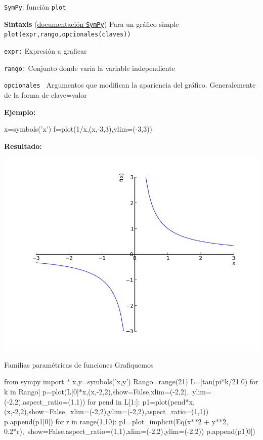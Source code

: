 \documentclass[handout,hyperref={colorlinks=true}]{beamer}
\begin{document}
\begin{frame}[fragile]{\texttt{SymPy}: función \texttt{plot}} 

\textbf{Sintaxis} (\href{http://docs.sympy.org/latest/modules/plotting.html}{documentación \texttt{SymPy}})
Para un gráfico simple
\texttt{plot(expr,rango,opcionales(claves))}

\texttt{expr:} Expresión a graficar 

\texttt{rango:} Conjunto donde varia la variable independiente 

\texttt{opcionales } Argumentos que modifican la apariencia del gráfico. Generalemente de la forma de clave=valor

\textbf{Ejemplo:}

\begin{sageblock}
x=symbols('x')
f=plot(1/x,(x,-3,3),ylim=(-3,3))
\end{sageblock}

\textbf{Resultado:} 

\includegraphics[scale=.15]{imagenes/ejemplo_plot.png}
\end{frame}










\begin{frame}[fragile]{Familias paramétricas de funciones} 
Grafiquemos
\begin{sageblock}
from sympy import *
x,y=symbols('x,y')
Rango=range(21)
L=[tan(pi*k/21.0) for k in Rango] 
p=plot(L[0]*x,(x,-2,2),show=False,xlim=(-2,2),\
ylim=(-2,2),aspect_ratio=(1,1))
for pend in L[1:]:
    p1=plot(pend*x,(x,-2,2),show=False,\
xlim=(-2,2),ylim=(-2,2),aspect_ratio=(1,1))
    p.append(p1[0])
for r in range(1,10):
    p1=plot_implicit(Eq(x**2 + y**2, 0.2*r),\
show=False,aspect_ratio=(1,1),xlim=(-2,2),ylim=(-2,2))
    p.append(p1[0])
\end{sageblock}



\end{frame}
\end{document}
